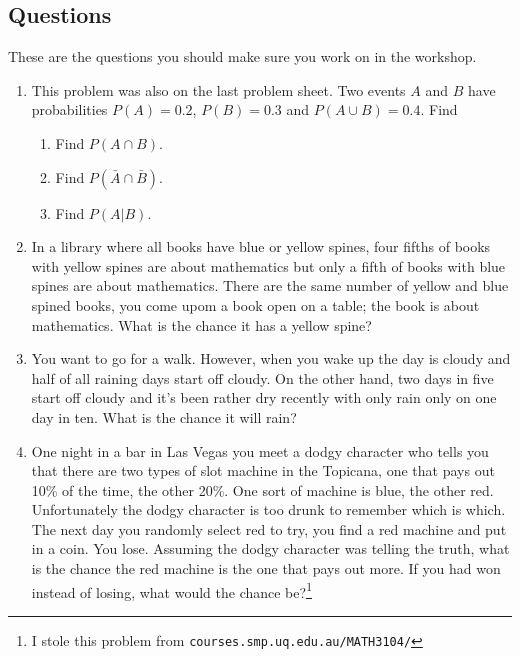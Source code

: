 \documentclass[11pt,a4paper]{scrartcl}
\begin{document}
\subsection*{Questions}

These are the questions you should make sure you work on in the workshop.

\begin{enumerate}

\item This problem was also on the last problem sheet. Two events $A$ and $B$ have probabilities $P(A)=0.2$, $P(B)=0.3$ and $P(A\cup B)=0.4$. Find
\begin{enumerate}
\item Find $P(A\cap B)$.
\item Find $P(\bar{A}\cap \bar{B})$.
\item Find $P(A|B)$.
\end{enumerate}

\item In a library where all books have blue or yellow spines, four
  fifths of books with yellow spines are about mathematics but only a
  fifth of books with blue spines are about mathematics. There are the
  same number of yellow and blue spined books, you come upom a book
  open on a table; the book is about mathematics. What is the chance
  it has a yellow spine?

\item You want to go for a walk. However, when you wake up the day is
  cloudy and half of all raining days start off cloudy. On the other
  hand, two days in five start off cloudy and it's been rather dry
  recently with only rain only on one day in ten. What is the chance
  it will rain?
  
\item One night in a bar in Las Vegas you meet a dodgy character who
  tells you that there are two types of slot machine in the Topicana,
  one that pays out 10\% of the time, the other 20\%. One sort of
  machine is blue, the other red. Unfortunately the dodgy character is
  too drunk to remember which is which. The next day you randomly
  select red to try, you find a red machine and put in a coin. You
  lose. Assuming the dodgy character was telling the truth, what is
  the chance the red machine is the one that pays out more. If you had
  won instead of losing, what would the chance be?\footnote{I stole
    this problem from \texttt{courses.smp.uq.edu.au/MATH3104/}}

\end{enumerate}
  
\end{document}
